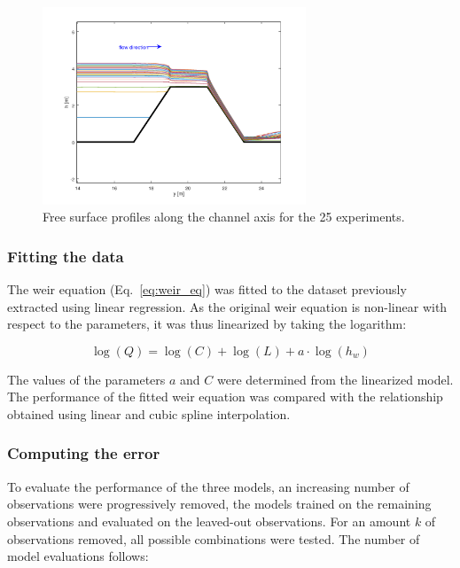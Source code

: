 \begin{figure}[h]
  \centering
  \includegraphics[width=0.7\textwidth]{Figures/free_surfaces.png}
  \caption{Free surface profiles along the channel axis for the \num{25} experiments.}
  \label{fig:free_surfaces}
\end{figure}


\subsubsection{Fitting the data}
The weir equation (Eq.~\ref{eq:weir_eq}) was fitted to the dataset previously extracted using linear regression.
As the original weir equation is non-linear with respect to the parameters, it was thus linearized by taking the logarithm:

\begin{equation}
  \log(Q) = \log(C) + \log(L) + a \cdot \log(h_w)
\end{equation}

\noindent The values of the parameters $a$ and $C$ were determined from the linearized model.
The performance of the fitted weir equation was compared with the relationship obtained using linear and cubic spline interpolation.

\subsubsection{Computing the error}\label{sec:compute_error}
To evaluate the performance of the three models, an increasing number of observations were progressively removed, the models trained on the remaining observations and evaluated on the leaved-out observations.
For an amount $k$ of observations removed, all possible combinations were tested. The number of model evaluations follows:

